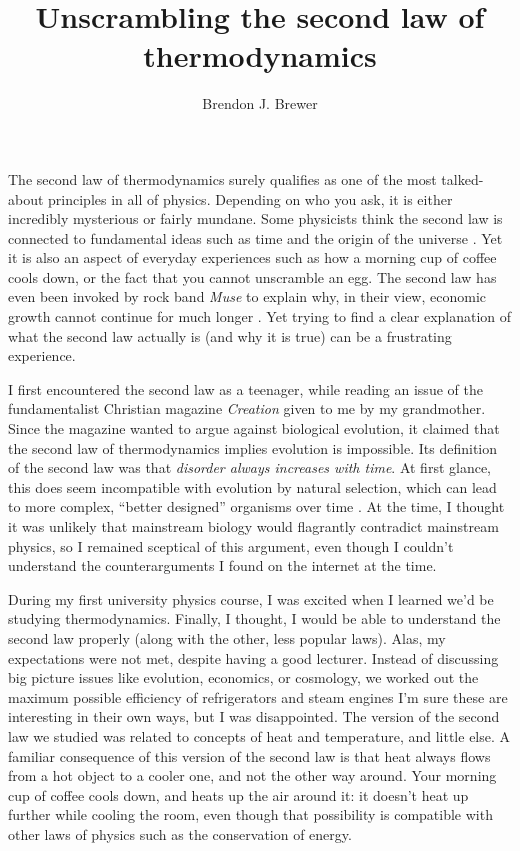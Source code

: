 \documentclass[a4paper, 12pt]{article}
\title{Unscrambling the second law of thermodynamics}
\author{Brendon J. Brewer}
\begin{document}
\sffamily
\maketitle

The second law of thermodynamics surely qualifies as one of the most
talked-about principles in all of physics. Depending on who you ask, it is
either incredibly mysterious or fairly mundane. Some physicists think
the second law is connected to
fundamental ideas such as time and the origin of the universe
\citep{carroll}. Yet it is also an aspect of everyday experiences
such as how a morning cup of coffee cools down,
or the fact that you cannot unscramble an egg.
The second law has even been invoked by rock band {\em Muse} to
explain why, in their
view, economic growth cannot continue for much longer \citep{muse}.
Yet trying to find a clear explanation of what the second law actually is
(and why it is true) can be a frustrating experience.

I first encountered the second law
as a teenager, while reading an issue of the fundamentalist Christian magazine
{\em Creation} given to me by my grandmother. Since the magazine wanted to
argue against biological evolution, it claimed that the second law of
thermodynamics implies evolution is impossible. Its definition of the second
law was that {\em disorder always increases with time}.
At first glance, this does seem incompatible with evolution by
natural selection, which can lead to more complex,
``better designed'' organisms over time \citep{dawkins}.
At the time, I thought it was unlikely that mainstream biology would flagrantly
contradict mainstream physics, so I remained sceptical of this argument,
even though I couldn't understand the counterarguments I found on the
internet at the time.

During my first university physics course, I was excited when I learned
we'd be
studying thermodynamics. Finally, I thought, I would be able to understand the
second law properly (along with the other, less popular laws).
Alas, my expectations were not met, despite having a good lecturer.
Instead of discussing big picture issues like evolution, economics, or
cosmology, we
worked out the maximum possible efficiency of refrigerators and steam engines
I'm sure these are interesting in their own ways, but I was disappointed.
The version of the second law we studied was related to concepts of heat
and temperature, and little else.
A familiar consequence of this version of the second law is that
heat always flows from a hot object to a cooler
one, and not the other way around. Your morning
cup of coffee cools down, and heats up the air around it: it doesn't heat
up further while cooling the room, even though that possibility is compatible
with other laws of physics such as the conservation of energy.
\end{document}
